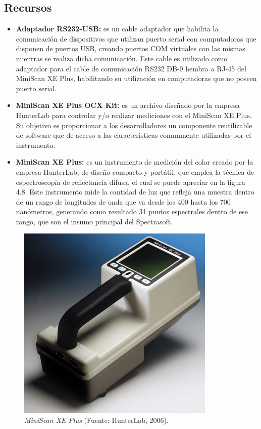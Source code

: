 	\subsection{Recursos}
	
		\begin{itemize}
			
			\item \textbf{Adaptador RS232-USB:} es un cable adaptador que habilita la comunicaci\'{o}n de dispositivos que utilizan puerto serial con computadoras que disponen de puertos USB, creando puertos COM virtuales con las mismas mientras se realiza dicha comunicaci\'{o}n. Este cable es utilizado como adaptador para el cable de comunicaci\'{o}n RS232 DB-9 hembra a RJ-45 del MiniScan XE Plus, habilitando su utilizaci\'{o}n en computadoras que no poseen puerto serial.
			
			\item \textbf{MiniScan XE Plus OCX Kit:} es un archivo dise\~{n}ado por la empresa HunterLab para controlar y/o realizar mediciones con el MiniScan XE Plus. Su objetivo es proporcionar a los desarrolladores un componente reutilizable de software que de acceso a las caracteristicas comunmente utilizadas por el instrumento.
			
			\item \textbf{MiniScan XE Plus:} es un instrumento de medici\'{o}n del color creado por la empresa HunterLab, de dise\~{n}o compacto y port\'{a}til, que emplea la t\'{e}cnica de espectroscop\'{i}a de reflectancia difusa, el cual se puede apreciar en la figura 4.8. Este instrumento mide la cantidad de luz que refleja una muestra dentro de un rango de longitudes de onda que va desde los 400 hasta los 700 nan\'{o}metros, generando como resultado 31 puntos espectrales dentro de ese rango, que son el insumo principal del Spectrasoft.
			
		\end{itemize}
		
	\begin{figure}[H]
		\centering
		\includegraphics[scale=1]{img/MiniScanXEPlus.png}
			\caption[MiniScan XE Plus]{\textit{MiniScan XE Plus} (Fuente: HunterLab, 2006).}
	\end{figure}
	
